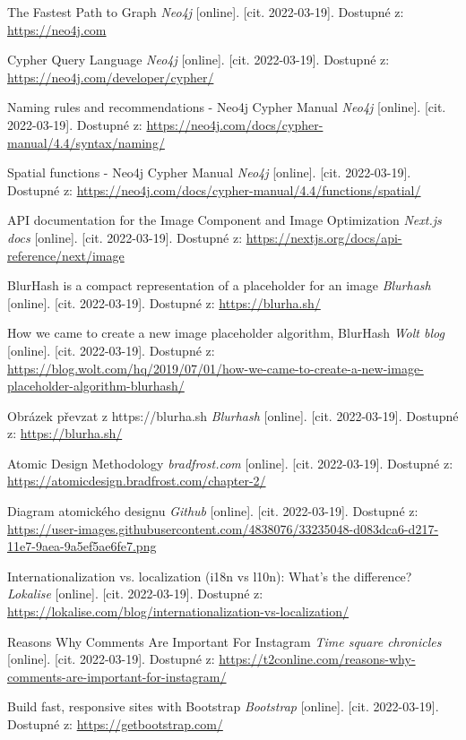 \begin{thebibliography}{100}
     The Fastest Path to Graph \textit{Neo4j} [online]. [cit. 2022-03-19]. Dostupné z: \url{https://neo4j.com}
    
     Cypher Query Language \textit{Neo4j} [online]. [cit. 2022-03-19]. Dostupné z: \url{https://neo4j.com/developer/cypher/}
    
     Naming rules and recommendations - Neo4j Cypher Manual \textit{Neo4j} [online]. [cit. 2022-03-19]. Dostupné z: \url{https://neo4j.com/docs/cypher-manual/4.4/syntax/naming/}
    
     Spatial functions - Neo4j Cypher Manual \textit{Neo4j} [online]. [cit. 2022-03-19]. Dostupné z: \url{https://neo4j.com/docs/cypher-manual/4.4/functions/spatial/}
    
     API documentation for the Image Component and Image Optimization \textit{Next.js docs} [online]. [cit. 2022-03-19]. Dostupné z: \url{https://nextjs.org/docs/api-reference/next/image}
    
     BlurHash is a compact representation of a placeholder for an image \textit{Blurhash} [online]. [cit. 2022-03-19]. Dostupné z: \url{https://blurha.sh/}
    
     How we came to create a new image placeholder algorithm, BlurHash \textit{Wolt blog} [online]. [cit. 2022-03-19]. Dostupné z: \url{https://blog.wolt.com/hq/2019/07/01/how-we-came-to-create-a-new-image-placeholder-algorithm-blurhash/}
    
     Obrázek převzat z https://blurha.sh \textit{Blurhash} [online]. [cit. 2022-03-19]. Dostupné z: \url{https://blurha.sh/}
    
     Atomic Design Methodology \textit{bradfrost.com} [online]. [cit. 2022-03-19]. Dostupné z: \url{https://atomicdesign.bradfrost.com/chapter-2/}
    
     Diagram atomického designu \textit{Github} [online]. [cit. 2022-03-19]. Dostupné z: \url{https://user-images.githubusercontent.com/4838076/33235048-d083dca6-d217-11e7-9aea-9a5ef5ae6fe7.png}
    
     Internationalization vs. localization (i18n vs l10n): What’s the difference? \textit{Lokalise} [online]. [cit. 2022-03-19]. Dostupné z: \url{https://lokalise.com/blog/internationalization-vs-localization/}
    
     Reasons Why Comments Are Important For Instagram \textit{Time square chronicles} [online]. [cit. 2022-03-19]. Dostupné z: \url{https://t2conline.com/reasons-why-comments-are-important-for-instagram/}
    
    
     Build fast, responsive sites with Bootstrap \textit{Bootstrap} [online]. [cit. 2022-03-19]. Dostupné z: \url{https://getbootstrap.com/}
    
    
    \end{thebibliography}
    
    \newpage{\pagestyle{empty}\cleardoublepage}